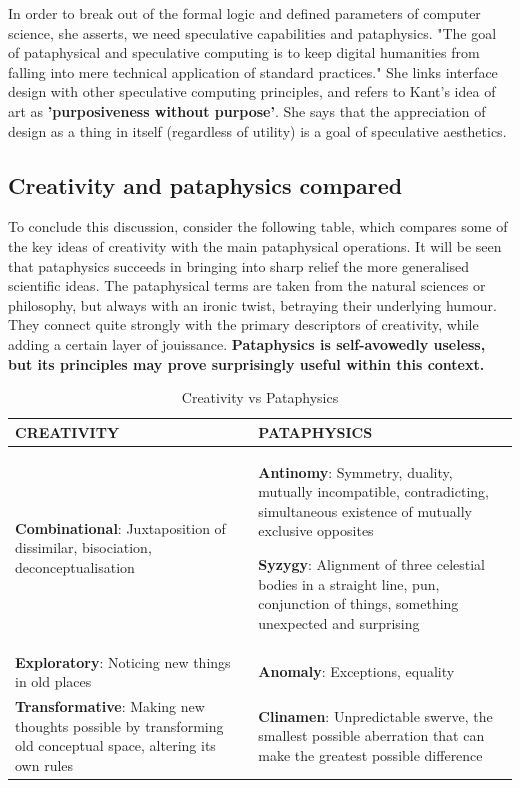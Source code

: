 In order to break out of the formal logic and defined parameters of computer science, she asserts, we need speculative capabilities and pataphysics. "The goal of pataphysical and speculative computing is to keep digital humanities from falling into mere technical application of standard practices." She links interface design with other speculative computing principles, and refers to Kant's idea of art as \textbf{'purposiveness without purpose'}. She says that the appreciation of design as a thing in itself (regardless of utility) is a goal of speculative aesthetics.

\subsection{Creativity and pataphysics compared}

To conclude this discussion, consider the following table, which compares some of the key ideas of creativity \citep{Boden2003, Indurkhya, Koestler1964} with the main pataphysical operations. It will be seen that pataphysics succeeds in bringing into sharp relief the more generalised scientific ideas. The pataphysical terms are taken from the natural sciences or philosophy, but always with an ironic twist, betraying their underlying humour. They connect quite strongly with the primary descriptors of creativity, while adding a certain layer of jouissance. \textbf{Pataphysics is self-avowedly useless, but its principles may prove surprisingly useful within this context.}

\begin{table}[htb]
  \begin{tabu}{XX}
  \toprule
  \textbf{CREATIVITY}
  &
  \textbf{PATAPHYSICS}
  \\ \midrule
  \textbf{Combinational}: Juxtaposition of dissimilar, bisociation, deconceptualisation
  &
  \textbf{Antinomy}: Symmetry, duality, mutually incompatible, contradicting, simultaneous existence of mutually exclusive opposites
  \par
  \textbf{Syzygy}: Alignment of three celestial bodies in a
  straight line, pun, conjunction of things, something unexpected
  and surprising
  \\ \midrule
  \textbf{Exploratory}: Noticing new things in old places
  &
  \textbf{Anomaly}: Exceptions, equality
  \\ \midrule
  \textbf{Transformative}: Making new thoughts possible by transforming old conceptual space, altering its own rules
  &
  \textbf{Clinamen}: Unpredictable swerve, the smallest possible aberration that can make the greatest possible difference
  \\
  \bottomrule
  \end{tabu}
\caption[Creativity vs Pataphysics]{Creativity vs Pataphysics}
\label{tab:creatpata}
\end{table}

